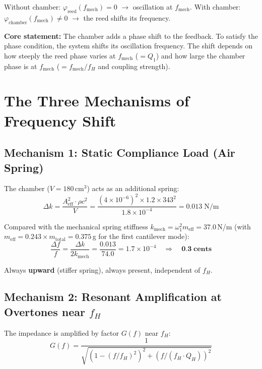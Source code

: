 \documentclass[11pt,a4paper]{article}
\begin{document}
Without chamber: $\varphi_\text{reed}(f_\text{mech}) = 0$ $\to$ oscillation at $f_\text{mech}$. With chamber: $\varphi_\text{chamber}(f_\text{mech}) \neq 0$ $\to$ the reed shifts its frequency.

\begin{keybox}
\textbf{Core statement:} The chamber adds a phase shift to the feedback. To satisfy the phase condition, the system shifts its oscillation frequency. The shift depends on how steeply the reed phase varies at $f_\text{mech}$ ($= Q_1$) and how large the chamber phase is at $f_\text{mech}$ ($= f_\text{mech}/f_H$ and coupling strength).
\end{keybox}

\section{The Three Mechanisms of Frequency Shift}

\subsection{Mechanism 1: Static Compliance Load (Air Spring)}

The chamber ($V = 180$\,cm$^3$) acts as an additional spring:
\begin{equation}
\Delta k = \frac{A_\text{eff}^2 \cdot \rho c^2}{V} = \frac{(4 \times 10^{-6})^2 \times 1{.}2 \times 343^2}{1{.}8 \times 10^{-4}} = 0{.}013\;\text{N/m}
\end{equation}

Compared with the mechanical spring stiffness $k_\text{mech} = \omega_1^2 m_\text{eff} = 37{.}0$\,N/m (with $m_\text{eff} = 0{.}243 \times m_\text{total} = 0{.}375$\,g for the first cantilever mode):
\begin{equation}
\frac{\Delta f}{f} = \frac{\Delta k}{2 k_\text{mech}} = \frac{0{.}013}{74{.}0} = 1{.}7 \times 10^{-4} \quad \Rightarrow \quad \mathbf{0{.}3\;\text{cents}}
\end{equation}

Always \textbf{upward} (stiffer spring), always present, independent of $f_H$.

\subsection{Mechanism 2: Resonant Amplification at Overtones near $f_H$}

The impedance is amplified by factor $G(f)$ near $f_H$:
\begin{equation}
G(f) = \frac{1}{\sqrt{\left(1 - (f/f_H)^2\right)^2 + \left(f/(f_H \cdot Q_H)\right)^2}}
\end{equation}
\end{document}

